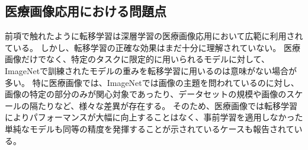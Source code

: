 \subsection{医療画像応用における問題点}
    前項で触れたように転移学習は深層学習の医療画像応用において広範に利用されている。
    しかし、転移学習の正確な効果はまだ十分に理解されていない。
    医療画像だけでなく、特定のタスクに限定的に用いられるモデルに対して、ImageNetで訓練されたモデルの重みを転移学習に用いるのは意味がない場合が多い。
    特に医療画像では、ImageNetでは画像の主題を問われているのに対し、画像の特定の部分のみが関心対象であったり、データセットの規模や画像のスケールの隔たりなど、様々な差異が存在する。
    そのため、医療画像では転移学習によりパフォーマンスが大幅に向上することはなく、事前学習を適用しなかった単純なモデルも同等の精度を発揮することが示されているケースも報告されている\cite{raghu2019transfusion}。